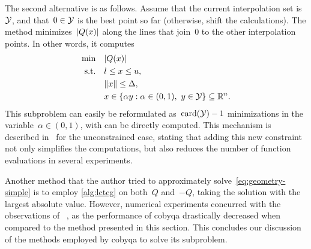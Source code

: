 The second alternative is as follows.
Assume that the current interpolation set is~$\xpt$, and that~$0 \in \xpt$ is the best point so far (otherwise, shift the calculations).
The method minimizes~$\abs{Q(\iter)}$ along the lines that join~$0$ to the other interpolation points.
In other words, it computes
\begin{align*}
    \min        & \quad \abs{Q(\iter)}\\
    \text{s.t.} & \quad \xl \le \iter \le \xu,\\
                & \quad \norm{\iter} \le \rad,\\
                & \quad \iter \in \set{\alpha y : \alpha \in (0, 1), ~ y \in \xpt} \subseteq \R^n.
\end{align*}
This subproblem can easily be reformulated as~$\card(\xpt) - 1$ minimizations in the variable~$\alpha \in (0, 1)$, with can be directly computed.
This mechanism is described in~\cite{Powell_2008} for the unconstrained case, stating that adding this new constraint not only simplifies the computations, but also reduces the number of function evaluations in several experiments.

Another method that the author tried to approximately solve~\cref{eq:geometry-simple} is to employ \cref{alg:lctcg} on both~$Q$ and~$-Q$, taking the solution with the largest absolute value.
However, numerical experiments concurred with the observations of \citeauthor{Powell_2008}~\cite{Powell_2008}, as the performance of \gls{cobyqa} drastically decreased when compared to the method presented in this section.
This concludes our discussion of the methods employed by \gls{cobyqa} to solve its subproblem.
